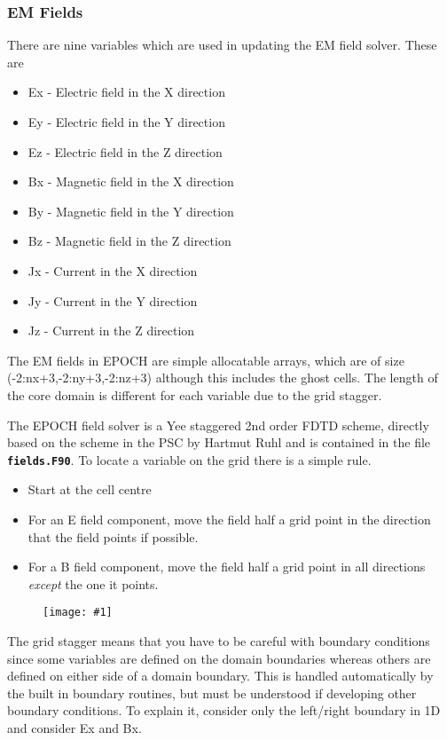 \documentclass[12pt]{article}
\newcommand{\inlinecode}[1]{{\color{warwickred} \bf\texttt{#1}}}
\newcommand{\nEPOCH}{{\color{warwickdark}\fontfamily{phv}\selectfont EPOCH}}
\newcommand{\EPOCH}{{\nEPOCH} }
\newcommand{\image}[1]
  {{\begin{figure} \centering \texttt{[image: \#1]} \end{figure}}}
\begin{document}
\subsubsection{EM Fields}
There are nine variables which are used in updating the EM field solver. These
are
\begin{itemize}
\item Ex - Electric field in the X direction
\item Ey - Electric field in the Y direction
\item Ez - Electric field in the Z direction
\item Bx - Magnetic field in the X direction
\item By - Magnetic field in the Y direction
\item Bz - Magnetic field in the Z direction
\item Jx - Current in the X direction
\item Jy - Current in the Y direction
\item Jz - Current in the Z direction
\end{itemize}
The EM fields in \EPOCH are simple allocatable arrays, which are of size
(-2:nx+3,-2:ny+3,-2:nz+3) although this includes the ghost cells. The length of
the core domain is different for each variable due to the grid stagger.

The \EPOCH field solver is a Yee staggered 2nd order FDTD scheme, directly
based on the scheme in the PSC by Hartmut Ruhl and is contained in the file
\inlinecode{fields.F90}. To locate a variable on the grid there is a simple
rule.
\begin{itemize}
\item Start at the cell centre
\item For an E field component, move the field half a grid point in the
  direction that the field points if possible.
\item For a B field component, move the field half a grid point in all
  directions {\it except} the one it points.
\end{itemize}

\image{./images/stagger.eps}

The grid stagger means that you have to be careful with boundary conditions
since some variables are defined on the domain boundaries whereas others are
defined on either side of a domain boundary. This is handled automatically by
the built in boundary routines, but must be understood if developing other
boundary conditions. To explain it, consider only the left/right boundary in 1D
and consider Ex and Bx.\\
\end{document}
